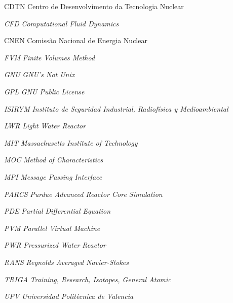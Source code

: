 \documentclass[12pt,openright,twoside,a4paper,english,french,spanish,brazil]{abntex2}
\begin{document}
\listoffigures*
\cleardoublepage

\listoftables*
\cleardoublepage








\begin{siglas}
  \item[CDTN] Centro de Desenvolvimento da Tecnologia Nuclear
  \item[\textit{CFD}] \textit{Computational Fluid Dynamics}
  \item[CNEN] Comissão Nacional de Energia Nuclear
  \item[\textit{FVM}] \textit{Finite Volumes Method}
  \item[\textit{GNU}] \textit{GNU's Not Unix}
  \item[\textit{GPL}] \textit{GNU Public License}
  \item[\textit{ISIRYM}] \textit{Instituto de Seguridad Industrial, Radiofísica y Medioambiental}
  \item[\textit{LWR}] \textit{Light Water Reactor}
  \item[\textit{MIT}] \textit{Massachusetts Institute of Technology}
  \item[\textit{MOC}] \textit{Method of Characteristics}
  \item[\textit{MPI}] \textit{Message Passing Interface}
  \item[\textit{PARCS}] \textit{Purdue Advanced Reactor Core Simulation}
  \item[\textit{PDE}] \textit{Partial Differential Equation}  
  \item[\textit{PVM}] \textit{Parallel Virtual Machine}
  \item[\textit{PWR}] \textit{Pressurized Water Reactor}
  \item[\textit{RANS}] \textit{Reynolds Averaged Navier-Stokes}
  \item[\textit{TRIGA}] \textit{Training, Research, Isotopes, General Atomic}
  \item[\textit{UPV}] \textit{Universidad Politècnica de Valencia}
\end{siglas}
\end{document}
